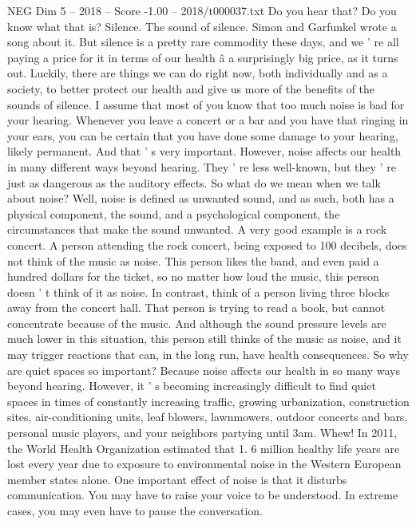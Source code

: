 \begin{textsample}{NEG Dim 5 – 2018 – Score -1.00 – 2018/t000037.txt}  \label{ex:f5_neg_017}
Do you hear that?
Do you know what that is?
Silence.
The sound of silence.
Simon and Garfunkel wrote a song about it.
But silence is a pretty rare commodity these days, and we ' re all paying a price for it in terms of our health â a surprisingly big price, as it turns out.
Luckily, there are things we can do right now, both individually and as a society, to better protect our health and give us more of the benefits of the sounds of silence.
I assume that most of you know that too much noise is bad for your hearing.
Whenever you leave a concert or a bar and you have that ringing in your ears, you can be certain that you have done some damage to your hearing, likely permanent.
And that ' s very important.
However, noise affects our health in many different ways beyond hearing.
They ' re less well-known, but they ' re just as dangerous as the auditory effects.
So what do we mean when we talk about noise?
Well, noise is defined as unwanted sound, and as such, both has a physical component, the sound, and a psychological component, the circumstances that make the sound unwanted.
A very good example is a rock concert.
A person attending the rock concert, being exposed to 100 decibels, does not think of the music as noise.
This person likes the band, and even paid a hundred dollars for the ticket, so no matter how loud the music, this person doesn ' t think of it as noise.
In contrast, think of a person living three blocks away from the concert hall.
That person is trying to read a book, but cannot concentrate because of the music.
And although the sound pressure levels are much lower in this situation, this person still thinks of the music as noise, and it may trigger reactions that can, in the long run, have health consequences.
So why are quiet spaces so important?
Because noise affects our health in so many ways beyond hearing.
However, it ' s becoming increasingly difficult to find quiet spaces in times of constantly increasing traffic, growing urbanization, construction sites, air-conditioning units, leaf blowers, lawnmowers, outdoor concerts and bars, personal music players, and your neighbors partying until 3am.
Whew!
In 2011, the World Health Organization estimated that 1. 6 million healthy life years are lost every year due to exposure to environmental noise in the Western European member states alone.
One important effect of noise is that it disturbs communication.
You may have to raise your voice to be understood.
In extreme cases, you may even have to pause the conversation.

\end{textsample}
